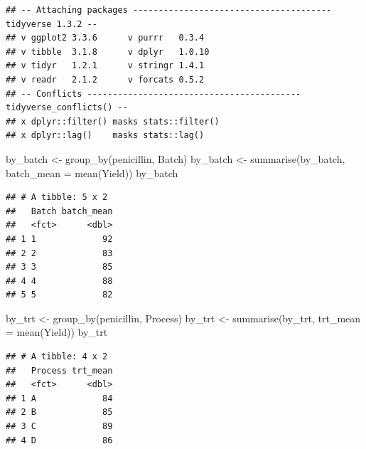 \documentclass[
]{book}
\newenvironment{Shaded}{\begin{snugshade}}{\end{snugshade}}
\newcommand{\AttributeTok}[1]{\textcolor[rgb]{0.77,0.63,0.00}{#1}}
\newcommand{\FunctionTok}[1]{\textcolor[rgb]{0.00,0.00,0.00}{#1}}
\newcommand{\NormalTok}[1]{#1}
\newcommand{\OtherTok}[1]{\textcolor[rgb]{0.56,0.35,0.01}{#1}}
\newcommand{\SpecialCharTok}[1]{\textcolor[rgb]{0.00,0.00,0.00}{#1}}
\begin{document}
\begin{verbatim}
## -- Attaching packages --------------------------------------- tidyverse 1.3.2 --
## v ggplot2 3.3.6      v purrr   0.3.4 
## v tibble  3.1.8      v dplyr   1.0.10
## v tidyr   1.2.1      v stringr 1.4.1 
## v readr   2.1.2      v forcats 0.5.2 
## -- Conflicts ------------------------------------------ tidyverse_conflicts() --
## x dplyr::filter() masks stats::filter()
## x dplyr::lag()    masks stats::lag()
\end{verbatim}

\begin{Shaded}
\begin{Highlighting}[]
\NormalTok{by\_batch }\OtherTok{\textless{}{-}} \FunctionTok{group\_by}\NormalTok{(penicillin, Batch)}
\NormalTok{by\_batch }\OtherTok{\textless{}{-}} \FunctionTok{summarise}\NormalTok{(by\_batch, }\AttributeTok{batch\_mean =} \FunctionTok{mean}\NormalTok{(Yield))}
\NormalTok{by\_batch}
\end{Highlighting}
\end{Shaded}

\begin{verbatim}
## # A tibble: 5 x 2
##   Batch batch_mean
##   <fct>      <dbl>
## 1 1             92
## 2 2             83
## 3 3             85
## 4 4             88
## 5 5             82
\end{verbatim}

\begin{Shaded}
\begin{Highlighting}[]
\NormalTok{by\_trt }\OtherTok{\textless{}{-}} \FunctionTok{group\_by}\NormalTok{(penicillin, Process)}
\NormalTok{by\_trt }\OtherTok{\textless{}{-}} \FunctionTok{summarise}\NormalTok{(by\_trt, }\AttributeTok{trt\_mean =} \FunctionTok{mean}\NormalTok{(Yield))}
\NormalTok{by\_trt}
\end{Highlighting}
\end{Shaded}

\begin{verbatim}
## # A tibble: 4 x 2
##   Process trt_mean
##   <fct>      <dbl>
## 1 A             84
## 2 B             85
## 3 C             89
## 4 D             86
\end{verbatim}

\begin{Shaded}
\end{Shaded}
\end{document}

